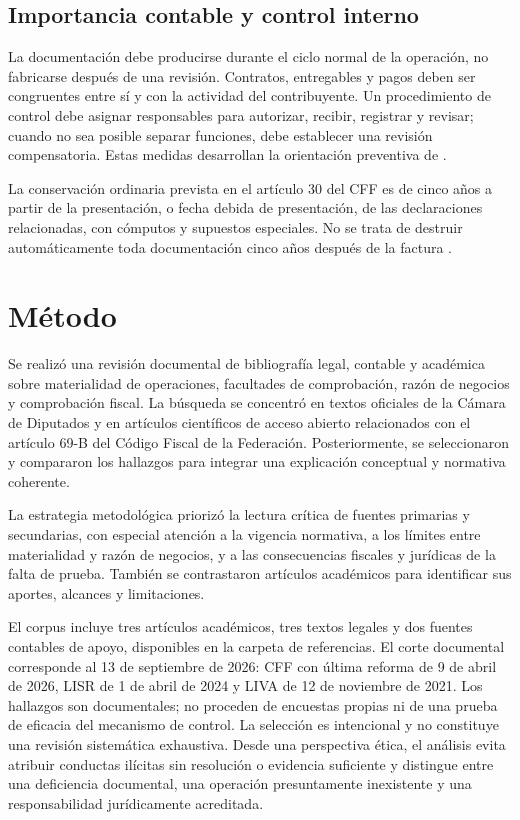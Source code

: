 \documentclass[spanish,12pt,letterpaper,oneside]{article}
\begin{document}
\subsection{Importancia contable y control interno}
La documentación debe producirse durante el ciclo normal de la operación, no fabricarse después de una revisión. Contratos, entregables y pagos deben ser congruentes entre sí y con la actividad del contribuyente. Un procedimiento de control debe asignar responsables para autorizar, recibir, registrar y revisar; cuando no sea posible separar funciones, debe establecer una revisión compensatoria. Estas medidas desarrollan la orientación preventiva de \textcite{rico2023mecanismo}.

La conservación ordinaria prevista en el artículo 30 del CFF es de cinco años a partir de la presentación, o fecha debida de presentación, de las declaraciones relacionadas, con cómputos y supuestos especiales. No se trata de destruir automáticamente toda documentación cinco años después de la factura \parencite[art. 30]{cff2026}.

\section{Método}
Se realizó una revisión documental de bibliografía legal, contable y académica sobre materialidad de operaciones, facultades de comprobación, razón de negocios y comprobación fiscal. La búsqueda se concentró en textos oficiales de la Cámara de Diputados y en artículos científicos de acceso abierto relacionados con el artículo 69-B del Código Fiscal de la Federación. Posteriormente, se seleccionaron y compararon los hallazgos para integrar una explicación conceptual y normativa coherente.

La estrategia metodológica priorizó la lectura crítica de fuentes primarias y secundarias, con especial atención a la vigencia normativa, a los límites entre materialidad y razón de negocios, y a las consecuencias fiscales y jurídicas de la falta de prueba. También se contrastaron artículos académicos para identificar sus aportes, alcances y limitaciones.

El corpus incluye tres artículos académicos, tres textos legales y dos fuentes contables de apoyo, disponibles en la carpeta de referencias. El corte documental corresponde al 13 de septiembre de 2026: CFF con última reforma de 9 de abril de 2026, LISR de 1 de abril de 2024 y LIVA de 12 de noviembre de 2021. Los hallazgos son documentales; no proceden de encuestas propias ni de una prueba de eficacia del mecanismo de control. La selección es intencional y no constituye una revisión sistemática exhaustiva.
Desde una perspectiva ética, el análisis evita atribuir conductas ilícitas sin resolución o evidencia suficiente y distingue entre una deficiencia documental, una operación presuntamente inexistente y una responsabilidad jurídicamente acreditada.
\end{document}
